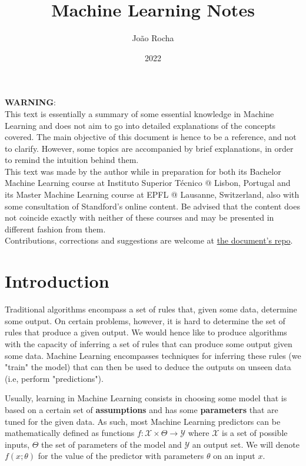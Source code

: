 \documentclass{article}
\title{Machine Learning Notes}
\date{2022}
\author{João Rocha}
\begin{document}
\maketitle
\tableofcontents
\vspace*{\fill}
\textbf{WARNING}:\\ 
This text is essentially a summary of some essential knowledge in Machine Learning and does not aim to go into detailed explanations of the concepts covered.
The main objective of this document is hence to be a reference, and not to clarify.
However, some topics are accompanied by brief explanations, in order to remind the intuition behind them.\\
This text was made by the author while in preparation for both its Bachelor Machine Learning course at Instituto Superior Técnico @ Lisbon, Portugal and its Master Machine Learning course at EPFL @ Lausanne, Switzerland, also with some consultation of Standford's online content.
Be advised that the content does not coincide exactly with neither of these courses and may be presented in different fashion from them.\\
Contributions, corrections and suggestions are welcome at \href{https://github.com/Calhau18/Machine_Learning_Notes}{the document's repo}.
\newpage

\section{Introduction}

Traditional algorithms encompass a set of rules that, given some data, determine some output.
On certain problems, however, it is hard to determine the set of rules that produce a given output.
We would hence like to produce algorithms with the capacity of inferring a set of rules that can produce some output given some data.
Machine Learning encompasses techniques for inferring these rules (we "train" the model) that can then be used to deduce the outputs on unseen data (i.e, perform "predictions").

Usually, learning in Machine Learning consists in choosing some model that is based on a certain set of \textbf{assumptions} and has some \textbf{parameters} that are tuned for the given data.
As such, most Machine Learning predictors can be mathematically defined as functions $f : \mathcal{X} \times \Theta \to \mathcal{Y}$ where $\mathcal{X}$ is a set of possible inputs, $\Theta$ the set of parameters of the model and $\mathcal{Y}$ an output set.
We will denote $f(x ; \theta)$ for the value of the predictor with parameters $\theta$ on an input $x$.
\end{document}
